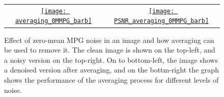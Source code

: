\documentclass{article}
\begin{document}
\begin{figure}
{\begin{tabular}{cc}
      \href{https://nbviewer.org/github/vicente-gonzalez-ruiz/denoising/blob/main/figs/averaging_denoising.ipynb\#averaging_0MMPG_barb}{\texttt{[image: averaging\_0MMPG\_barb]}} & \href{https://nbviewer.org/github/vicente-gonzalez-ruiz/denoising/blob/main/figs/averaging_denoising.ipynb\#PSNR_averaging_0MMPG_barb}{\texttt{[image: PSNR\_averaging\_0MMPG\_barb]}}
    \end{tabular}
  }
  \caption{Effect of zero-mean MPG noise in an image and how averaging
    can be used to remove it. The clean image is shown on the
    top-left, and a noisy version on the top-right. On to bottom-left, the
    image shows a denoised version after averaging, and on the bottm-right
    the graph shows the performance of the averaging process for different
    levels of noise.\label{fig:averaging_0MMPG}}
\end{figure}
\end{document}

